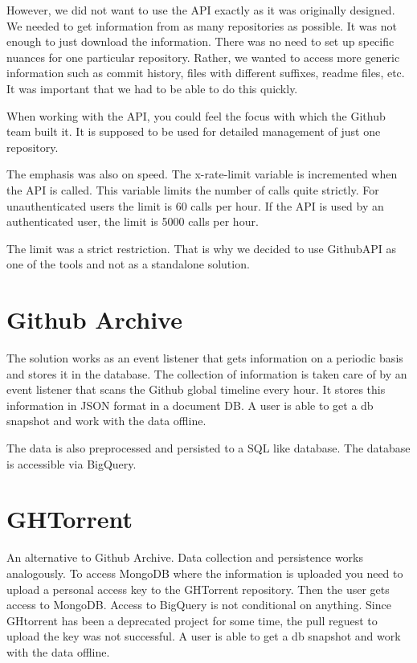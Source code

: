 \documentclass[thesis=M,english]{FITthesis}[2019/12/23]
\begin{document}
However, we did not want to use the API exactly as it was originally designed. We needed to get information from as many repositories as possible. It was not enough to just download the information. There was no need to set up specific nuances for one particular repository. Rather, we wanted to access more generic information such as commit history, files with different suffixes, readme files, etc. It was important that we had to be able to do this quickly.   

When working with the API, you could feel the focus with which the Github team built it. It is supposed to be used for detailed management of just one repository. 

The emphasis was also on speed. The x-rate-limit variable is incremented when the API is called. This variable limits the number of calls quite strictly.  For unauthenticated users the limit is 60 calls per hour. If the API is used by an authenticated user, the limit is 5000 calls per hour.

The limit was a strict restriction. That is why we decided to use GithubAPI as one of the tools and not as a standalone solution.

\section{Github Archive}
The solution works as an event listener that gets information on a periodic basis and stores it in the database. The collection of information is taken care of by an event listener that scans the Github global timeline every hour. It stores this information in JSON format in a document DB. A user is able to get a db snapshot and work with the data offline.

The data is also preprocessed and persisted to a SQL like database. The database is accessible via BigQuery.

\section{GHTorrent}
An alternative to Github Archive. Data collection and persistence works analogously. To access MongoDB where the information is uploaded you need to upload a personal access key to the GHTorrent repository. Then the user gets access to MongoDB. Access to BigQuery is not conditional on anything. Since GHtorrent has been a deprecated project for some time, the pull reguest to upload the key was not successful.
A user is able to get a db snapshot and work with the data offline.
\end{document}

